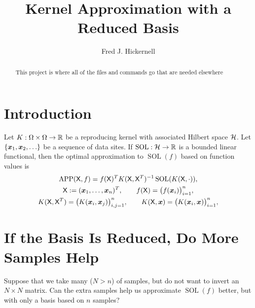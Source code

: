 \documentclass{amsart}
\DeclareMathOperator{\SOL}{SOL}
\DeclareMathOperator{\APP}{APP}
\begin{document}
\title{Kernel Approximation with a Reduced Basis}
\author{Fred J. Hickernell}
\begin{abstract}This project is where all of the files and commands go that are needed elsewhere
\end{abstract}

\maketitle

\section{Introduction}\label{sec:intro}
Let $K:\Omega \times \Omega \to \mathbb{R}$ be a reproducing kernel with associated Hilbert space $\mathcal{H}$. Let $\{\boldsymbol{x}_1, \boldsymbol{x}_2, \ldots\}$ be a sequence of data sites.  If $\SOL: \ch \to \reals$ is a bounded linear functional, then the optimal approximation to $\SOL(f)$ based on function values  is 
\begin{subequations}  \label{eq:bestappx}
\begin{gather}
    \APP(\mX,f) =  f(\mX)^T K(\mX,\mX^T)^{-1}\SOL(K(\mX,\cdot)), \\
    \mX := (\vx_1, \dots, \vx_n)^T, \qquad  f(\mX) = \bigl(f(\vx_i) \bigr)_{i=1}^n, \\
    K(\mX,\mX^T) = \bigl(K(\vx_i,\vx_j)\bigr)_{i,j=1}^n, \qquad
     K(\mX,\vx) = \bigl(K(\vx_i,\vx)\bigr)_{i=1}^n, 
\end{gather}
\end{subequations}

\section{If the Basis Is Reduced, Do More Samples Help}
Suppose that we take many ($N > n$) of samples, but do not want to invert an $N \times N$ matrix.  Can the extra samples help us approximate $\SOL(f)$ better, but with only a basis based on $n$ samples?



\end{document}
